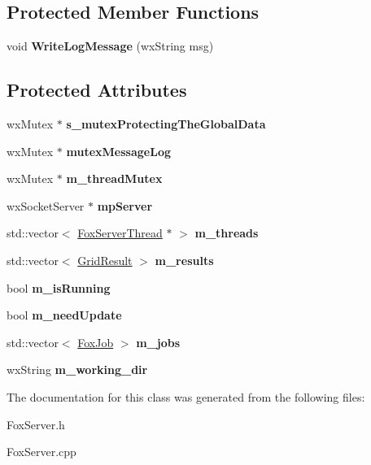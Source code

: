 \subsection*{Protected Member Functions}
\begin{DoxyCompactItemize}
\item 
\mbox{\label{class_fox_server_a2caae95405baafc7cfeae77682e9a800}} 
void {\bfseries Write\+Log\+Message} (wx\+String msg)
\end{DoxyCompactItemize}
\subsection*{Protected Attributes}
\begin{DoxyCompactItemize}
\item 
\mbox{\label{class_fox_server_a2b4f2dd68ecaf75b0c702b894a812d2b}} 
wx\+Mutex $\ast$ {\bfseries s\+\_\+mutex\+Protecting\+The\+Global\+Data}
\item 
\mbox{\label{class_fox_server_aa781ecca4b5f4b80ddfefcfb60d4cbf4}} 
wx\+Mutex $\ast$ {\bfseries mutex\+Message\+Log}
\item 
\mbox{\label{class_fox_server_ae2144ba716b6ea905a2d4c85193716df}} 
wx\+Mutex $\ast$ {\bfseries m\+\_\+thread\+Mutex}
\item 
\mbox{\label{class_fox_server_a78ee1995ef7db417d6455f95056fe62e}} 
wx\+Socket\+Server $\ast$ {\bfseries mp\+Server}
\item 
\mbox{\label{class_fox_server_a048aa68ac02420fa24056e95139078e8}} 
std\+::vector$<$ \mbox{\hyperlink{class_fox_server_thread}{Fox\+Server\+Thread}} $\ast$ $>$ {\bfseries m\+\_\+threads}
\item 
\mbox{\label{class_fox_server_a868f6935ca6d00c8d500be2cf421835e}} 
std\+::vector$<$ \mbox{\hyperlink{class_grid_result}{Grid\+Result}} $>$ {\bfseries m\+\_\+results}
\item 
\mbox{\label{class_fox_server_a3b6baf61774657c72dd06d4cc33e4c27}} 
bool {\bfseries m\+\_\+is\+Running}
\item 
\mbox{\label{class_fox_server_a1451821b05ce893672fb2fd7c2ca6930}} 
bool {\bfseries m\+\_\+need\+Update}
\item 
\mbox{\label{class_fox_server_a35201605805e70f4324cde46b1f39eb1}} 
std\+::vector$<$ \mbox{\hyperlink{class_fox_job}{Fox\+Job}} $>$ {\bfseries m\+\_\+jobs}
\item 
\mbox{\label{class_fox_server_abc63f35998913aab7e662e6a8cf467f3}} 
wx\+String {\bfseries m\+\_\+working\+\_\+dir}
\end{DoxyCompactItemize}


The documentation for this class was generated from the following files\+:\begin{DoxyCompactItemize}
\item 
Fox\+Server.\+h\item 
Fox\+Server.\+cpp\end{DoxyCompactItemize}

